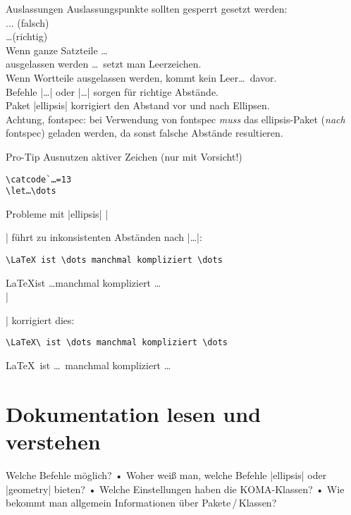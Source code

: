 \begin{frame}[fragile]{Auslassungen}
Auslassungspunkte sollten gesperrt gesetzt werden:
\\... (falsch) \\\ldots (richtig)
\\ Wenn ganze Satzteile \ldots %
\\ ausgelassen werden \ldots\ setzt man Leerzeichen.
\\ Wenn Wortteile ausgelassen werden, kommt kein Leer\dots\ davor.
\\[2em]
Befehle |\dots| oder |\ldots| sorgen für richtige Abstände.\\
Paket |ellipsis| korrigiert den Abstand vor und nach Ellipsen.\\
\alert{Achtung, fontspec:} bei Verwendung von \textsf{fontspec} \emph{muss} das \textsf{ellipsis}-Paket (\emph{nach} \textsf{fontspec}) geladen werden, da sonst falsche Abstände resultieren.\pause
\begin{block}{Pro-Tip}
Ausnutzen aktiver Zeichen (nur mit Vorsicht!)
\begin{verbatim}
\catcode`…=13
\let…\dots
\end{verbatim}
\end{block}
\end{frame}

\begin{frame}[fragile]{Probleme mit |ellipsis|}
|\usepackage{ellipsis}| führt zu inkonsistenten Abständen nach |\dots|:
\begin{lstlisting}
\LaTeX ist \dots manchmal kompliziert \dots
\end{lstlisting}
\LaTeX ist \dots{}manchmal kompliziert \dots
\\[1em]\pause
|\usepackage[xspace]{ellipsis}| korrigiert dies:
\begin{lstlisting}
\LaTeX\ ist \dots manchmal kompliziert \dots
\end{lstlisting}
\LaTeX\ ist \dots\ manchmal kompliziert \dots
\end{frame}

\section{Dokumentation lesen und verstehen}
\begin{frame}[fragile]{Welche Befehle möglich?}
• Woher weiß man, welche Befehle |ellipsis| oder |geometry| bieten?
• Welche Einstellungen haben die KOMA-Klassen?
• Wie bekommt man allgemein Informationen über Pakete\,/\,Klassen?
\•
\end{frame}

